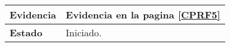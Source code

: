 \begin{longtable}{|l|l|}
\textbf{Evidencia}                                                                      &   Evidencia en la pagina \ref{CPRF5}                                                                                                                                                                                                                                          \\ \hline
\textbf{Estado}                                                                         & Iniciado.                                                                                                                                                                                                                                 \\ \hline
\end{longtable}